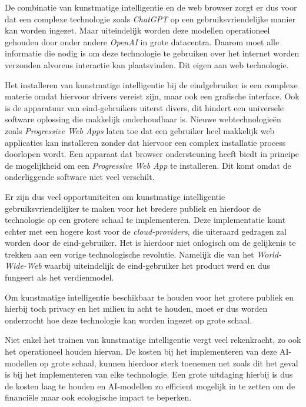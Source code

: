\bigbreak{}

De combinatie van kunstmatige intelligentie en de web browser zorgt er dus voor dat een complexe technologie zoals \textit{ChatGPT} op een gebruiksvriendelijke manier kan worden ingezet. Maar uiteindelijk worden deze modellen operationeel gehouden door onder andere \textit{OpenAI} in grote datacentra. Daarom moet alle informatie die nodig is om deze technologie te gebruiken over het internet worden verzonden alvorens interactie kan plaatsvinden. Dit eigen aan web technologie.

\bigbreak{}

Het installeren van kunstmatige intelligentie bij de eindgebruiker is een complexe materie omdat hiervoor drivers vereist zijn, maar ook een grafische interface. Ook is de apparatuur van eind-gebruikers uiterst divers, dit hindert een universele software oplossing die makkelijk onderhoudbaar is. Nieuwe webtechnologieën zoals \textit{Progressive Web Apps} laten toe dat een gebruiker heel makkelijk web applicaties kan installeren zonder dat hiervoor een complex installatie process doorlopen wordt. Een apparaat dat browser ondersteuning heeft biedt in principe de mogelijkheid om een \textit{Progressive Web App} te installeren. Dit komt omdat de onderliggende software niet veel verschilt.

\break{}

Er zijn dus veel opportuniteiten om kunstmatige intelligentie gebruiksvriendelijker te maken voor het bredere publiek en hierdoor de technologie op een grotere schaal te implementeren. Deze implementatie komt echter met een hogere kost voor de \textit{cloud-providers}, die uiteraard gedragen zal worden door de eind-ge\-brui\-ker. Het is hierdoor niet onlogisch om de gelijkenis te trekken aan een vorige technologische revolutie. Namelijk die van het \textit{World-Wide-Web} waarbij uiteindelijk de eind-gebruiker het product werd en dus fungeert als het verdienmodel.

\bigbreak{}

Om kunstmatige intelligentie beschikbaar te houden voor het grotere publiek en hierbij toch privacy en het milieu in acht te houden, moet er dus worden onderzocht hoe deze technologie kan worden ingezet op grote schaal.

\bigbreak{}

Niet enkel het trainen van kunstmatige intelligentie vergt veel rekenkracht, zo ook het operationeel houden hiervan. De kosten bij het implementeren van deze AI-modellen op grote schaal, kunnen hierdoor sterk toenemen net zoals dit het geval is bij het implementeren van elke technologie. Een grote uitdaging hierbij is dus de kosten laag te houden en AI-modellen zo efficient mogelijk in te zetten om de financiële maar ook ecologische impact te beperken.

